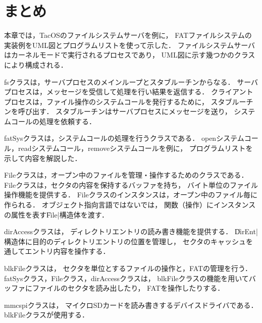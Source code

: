 \section{まとめ}
本章では，TacOSのファイルシステムサーバを例に，
FATファイルシステムの実装例をUML図とプログラムリストを使って示した．
ファイルシステムサーバはカーネルモードで実行されるプロセスであり，
UML図に示す幾つかのクラスにより構成される．

fsクラスは，サーバプロセスのメインループとスタブルーチンからなる．
サーバプロセスは，メッセージを受信して処理を行い結果を返信する．
クライアントプロセスは，ファイル操作のシステムコールを発行するために，
スタブルーチンを呼び出す．
スタブルーチンはサーバプロセスにメッセージを送り，
システムコールの処理を依頼する．

fatSysクラスは，システムコールの処理を行うクラスである．
openシステムコール，readシステムコール，removeシステムコールを例に，
プログラムリストを示して内容を解説した．

Fileクラスは，オープン中のファイルを管理・操作するためのクラスである．
Fileクラスは，セクタの内容を保持するバッファを持ち，
バイト単位のファイル操作機能を提供する．
Fileクラスのインスタンスは，オープン中のファイル毎に作られる．
オブジェクト指向言語ではない{\cmml}では，
関数（操作）にインスタンスの属性を表す\|File|構造体を渡す．

dirAccessクラスは，
ディレクトリエントリの読み書き機能を提供する．
\|DirEnt|構造体に目的のディレクトリエントリの位置を管理し，
セクタのキャッシュを通してエントリ内容を操作する．

blkFileクラスは，
セクタを単位とするファイルの操作と，FATの管理を行う．
fatSysクラス，Fileクラス，dirAccessクラスは，
blkFileクラスの機能を用いてバッファにファイルのセクタを読み出したり，
FATを操作したりする．

mmcspiクラスは，
マイクロSDカードを読み書きするデバイスドライバである．
blkFileクラスが使用する．
